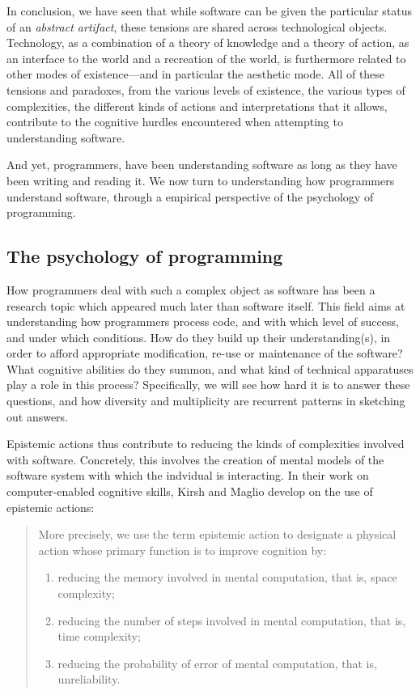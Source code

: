 \spacer

In conclusion, we have seen that while software can be given the particular status of an \emph{abstract artifact}, these tensions are shared across technological objects. Technology, as a combination of a theory of knowledge and a theory of action, as an interface to the world and a recreation of the world, is furthermore related to other modes of existence—and in particular the aesthetic mode. All of these tensions and paradoxes, from the various levels of existence, the various types of complexities, the different kinds of actions and interpretations that it allows, contribute to the cognitive hurdles encountered when attempting to understanding software.

And yet, programmers, have been understanding software as long as they have been writing and reading it. We now turn to understanding how programmers understand software, through a empirical perspective of the psychology of programming.


\subsection{The psychology of programming}
\label{subsec:psychology-programming}

How programmers deal with such a complex object as software has been a research topic which appeared much later than software itself. This field aims at understanding how programmers process code, and with which level of success, and under which conditions. How do they build up their understanding(s), in order to afford appropriate modification, re-use or maintenance of the software? What cognitive abilities do they summon, and what kind of technical apparatuses play a role in this process? Specifically, we will see how hard it is to answer these questions, and how diversity and multiplicity are recurrent patterns in sketching out answers.

Epistemic actions thus contribute to reducing the kinds of complexities involved with software. Concretely, this involves the creation of mental models of the software system with which the indvidual is interacting. In their work on computer-enabled cognitive skills, Kirsh and Maglio develop on the use of epistemic actions:

\begin{quote}
    More precisely, we use the term epistemic action to designate a physical action whose primary function is to improve cognition by:
    \begin{enumerate}
        \item{reducing the memory involved in mental computation, that is, space complexity;}
        \item{reducing the number of steps involved in mental computation, that is, time complexity;}
        \item{reducing the probability of error of mental computation, that is, unreliability.}
    \end{enumerate}
    \citep{kirsh_distinguishing_1994}
\end{quote}


